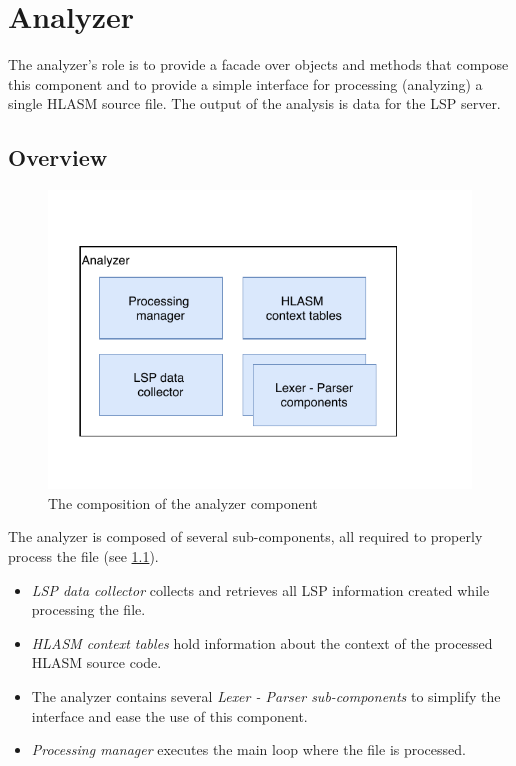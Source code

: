 \chapter {Analyzer}

The analyzer's role is to provide a facade over objects and methods that compose this component and to provide a simple interface for processing (analyzing) a single HLASM source file. The output of the analysis is data for the LSP server.

\section{Overview}

\begin{figure}
	\centering
	\includegraphics[width=\textwidth / 2]{img/analyzer_arch}
	\caption{The composition of the analyzer component}
	\label{fig06:analyzer}
\end{figure}

The analyzer is composed of several sub-components, all required to properly process the file (see \cref{fig06:analyzer}). 
\begin{itemize}
	\item \emph{LSP data collector} collects and retrieves all LSP information created while processing the file.
	\item \emph{HLASM context tables} hold information about the context of the processed HLASM source code.
	\item The analyzer contains several \emph{Lexer - Parser sub-components} to simplify the interface and ease the use of this component.
	\item \emph{Processing manager} executes the main loop where the file is processed.
\end{itemize}

